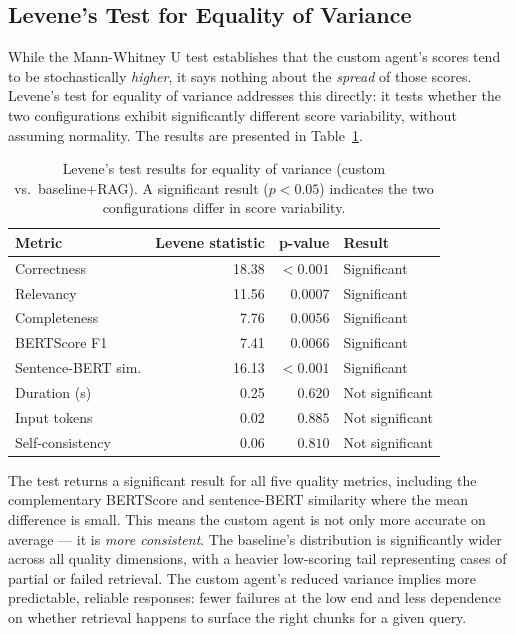 \subsection{Levene's Test for Equality of Variance}

While the Mann-Whitney U test establishes that the custom agent's scores tend to be
stochastically \emph{higher}, it says nothing about the \emph{spread} of those scores.
Levene's test for equality of variance addresses this directly: it tests whether the
two configurations exhibit significantly different score variability, without assuming
normality. The results are presented in Table~\ref{tab:levene}.

\begin{table}[H]
\centering
\caption{Levene's test results for equality of variance (custom vs.\ baseline+RAG).
         A significant result ($p < 0.05$) indicates the two configurations differ in
         score variability.}
\label{tab:levene}
\begin{tabular}{lrrl}
\hline
\textbf{Metric} & \textbf{Levene statistic} & \textbf{p-value} & \textbf{Result} \\
\hline
Correctness         & 18.38 & $< 0.001$ & Significant \\
Relevancy           & 11.56 & $0.0007$  & Significant \\
Completeness        &  7.76 & $0.0056$  & Significant \\
BERTScore F1        &  7.41 & $0.0066$  & Significant \\
Sentence-BERT sim.  & 16.13 & $< 0.001$ & Significant \\
\hline
Duration (s)        &  0.25 & $0.620$   & Not significant \\
Input tokens        &  0.02 & $0.885$   & Not significant \\
Self-consistency    &  0.06 & $0.810$   & Not significant \\
\hline
\end{tabular}
\end{table}

The test returns a significant result for all five quality metrics, including the
complementary BERTScore and sentence-BERT similarity where the mean difference is small.
This means the custom agent is not only more accurate on average --- it is
\emph{more consistent}. The baseline's distribution is significantly wider across all
quality dimensions, with a heavier low-scoring tail representing cases of partial or
failed retrieval. The custom agent's reduced variance implies more predictable, reliable
responses: fewer failures at the low end and less dependence on whether retrieval happens
to surface the right chunks for a given query.

